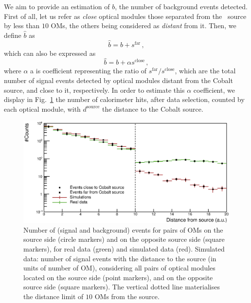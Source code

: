 We aim to provide an estimation of $b$, the number of background events detected.
First of all, let us refer as \emph{close} optical modules those separated from the \Co\ source by less than $10$ OMs, the others being considered as \emph{distant} from it.
Then, we define $\hat{b}$ as
\begin{equation}
  \hat{b} = b + s^{\text{far}}\,,
\end{equation}
which can also be expressed as
\begin{equation}
  \hat{b} = b + \alpha s^{\text{close}}\,,
  \label{eq:estimation_bdf}
\end{equation}
where $\alpha$ a is coefficient representing the ratio of $s^{\text{far}}/s^{\text{close}}$, which are the total number of signal events detected by optical modules distant from the Cobalt source, and close to it, respectively.
In order to estimate this $\alpha$ coefficient, we display in Fig.~\ref{fig:Co_data_bkg} the number of calorimeter hits, after data selection, counted by each optical module, with $d^{\text{source}}$ the distance to the Cobalt source.
\begin{figure}[h]
  \centering
  \includegraphics[width=1.1\textwidth]{commissioning/fig_commissioning/Co_data_bkg.eps}
  \caption{Number of (signal and background) events for pairs of OMs on the source side (circle markers) and on the opposite source side (square markers), for real data (green) and simulated data (red).
    Simulated data: number of signal events with the distance to the source (in units of number of OM), considering all pairs of optical modules located on the source side (point markers), and on the opposite source side (square markers).
    The vertical dotted line materialises the distance limit of $10$ OMs from the source.
    \label{fig:Co_data_bkg}}
\end{figure}
